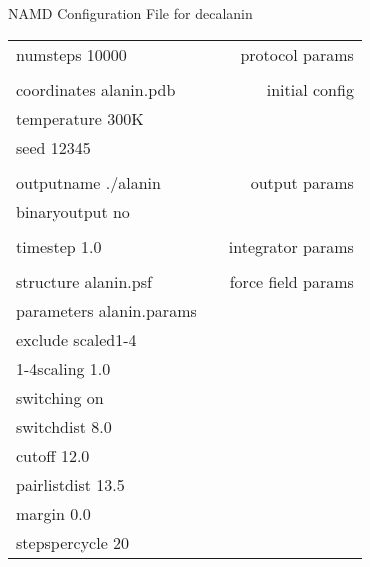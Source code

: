 \documentclass[slidestop,mathserif,compress,xcolor=svgnames]{beamer}
\begin{document}
\begin{frame}
  \frametitle{\small }
  {\scriptsize
  \vspace{-0.35cm}
  \begin{exampleblock}{NAMD Configuration File for decalanin}
    \begin{tabular}{lcr}
      numsteps  10000  &  &  {\color{red}protocol params}\\
      & &  \\
      coordinates alanin.pdb & &  {\color{red}initial config} \\
      temperature 300K & &  \\
      seed    12345 & &  \\
      & &  \\
      outputname  ./alanin & &  {\color{red}output params} \\
      binaryoutput  no & &  \\
      & &  \\
      timestep  1.0 & &  {\color{red}integrator params} \\
      & &  \\
      structure alanin.psf & &  {\color{red}force field params}\\
      parameters  alanin.params & &  \\
      exclude   scaled1-4 & &  \\
      1-4scaling  1.0 & &  \\
      switching on & &  \\
      switchdist  8.0 & &  \\
      cutoff    12.0 & &  \\
      pairlistdist  13.5 & &  \\
      margin    0.0 & &  \\
      stepspercycle 20 & &  \\
    \end{tabular}
  \end{exampleblock}
  }
\end{frame}
\end{document}
